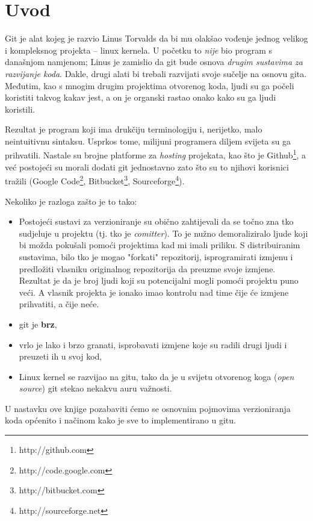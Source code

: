 \chapter*{Uvod}

Git je alat kojeg je razvio Linus Torvalds da bi mu olakšao vođenje jednog velikog i kompleksnog projekta -- linux kernela.
U početku to \emph{nije} bio program s današnjom namjenom; Linus je zamislio da git bude osnova \emph{drugim sustavima za razvijanje koda}.
Dakle, drugi alati bi trebali razvijati svoje sučelje na osnovu gita.
Međutim, kao s mnogim drugim projektima otvorenog koda, ljudi su ga počeli koristiti takvog kakav jest, a on je organski rastao onako kako su ga ljudi koristili.

Rezultat je program koji ima drukčiju terminologiju i, nerijetko, malo neintuitivnu sintaksu.
Usprkos tome, milijuni programera diljem svijeta su ga prihvatili. 
Nastale su brojne platforme za \emph{hosting} projekata, kao što je Github\footnote{http://github.com}, a već postojeći su morali dodati git jednostavno zato što su to njihovi korisnici tražili (Google Code\footnote{http://code.google.com}, Bitbucket\footnote{http://bitbucket.com}, Sourceforge\footnote{http://sourceforge.net}).

Nekoliko je razloga zašto je to tako:

\begin{itemize}
	\item Postojeći sustavi za verzioniranje su obično zahtijevali da se točno zna tko sudjeluje u projektu (tj. tko je \emph{comitter}). To je nužno demoraliziralo ljude koji bi možda pokušali pomoći projektima kad mi imali priliku. S distribuiranim sustavima, bilo tko je mogao "forkati" repozitorij, isprogramirati izmjenu i predložiti vlasniku originalnog repozitorija da preuzme svoje izmjene. Rezultat je da je broj ljudi koji su potencijalni mogli pomoći projektu puno veći. A vlasnik projekta je ionako imao kontrolu nad time čije će izmjene prihvatiti, a čije neće.
	\item git je \textbf{brz},
	\item vrlo je lako i brzo granati, isprobavati izmjene koje su radili drugi ljudi i preuzeti ih u svoj kod,
	\item Linux kernel se razvijao na gitu, tako da je u svijetu otvorenog koga (\emph{open source}) git stekao nekakvu auru važnosti.
\end{itemize}

U nastavku ove knjige pozabaviti ćemo se osnovnim pojmovima verzioniranja koda općenito i načinom kako je sve to implementirano u gitu.

